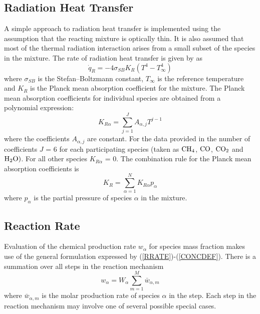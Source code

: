 \documentclass[dvips]{article}
\begin{document}
\subsection{Radiation Heat Transfer}
\label{SEC:RADCAL}
A simple approach to radiation heat transfer is implemented using the
assumption that the reacting mixture is optically thin.  It is also
assumed that most of the thermal radiation interaction arises
from a small subset of the species in the mixture.  The rate of
radiation heat transfer is given by \cite{JuEtAl} as
\begin{equation}
\dot{q}_{R} = -4\sigma_{SB} K_{R}\left(T^{4} - T_{\infty}^{4}\right)
\end{equation}
where $\sigma_{SB}$ is the Stefan--Boltzmann constant, $T_{\infty}$ is
the reference temperature and $K_{R}$ is the Planck mean absorption
coefficient for the mixture.  The Planck mean absorption coefficients
for individual species are obtained from a polynomial expression:
\begin{equation}
K_{R\alpha} = \sum_{j=1}^{J}A_{\alpha,j}T^{j-1}
\end{equation}
where the coefficients $A_{\alpha,j}$ are constant.  For the data
provided in \cite{JuEtAl} the number of coefficients $J$ = 6 for each
participating species (taken as ${\rm CH}_{4}$, ${\rm CO}$, ${\rm CO}_{2}$
and ${\rm H}_{2}{\rm O})$.  For all other species $K_{R\alpha}$ = 0.  The
combination rule for the Planck mean absorption coefficients is
\begin{equation}
K_{R} = \sum_{\alpha=1}^{N}K_{R\alpha}p_{\alpha}
\label{RADCOMBO}
\end{equation}
where $p_{\alpha}$ is the partial pressure of species $\alpha$ in the
mixture.

\subsection{Reaction Rate}
Evaluation of the chemical production rate $w_{\alpha}$ for species mass
fraction makes use of the general formulation expressed by
(\ref{RRATE})-(\ref{CONCDEF}).  There is a summation over all steps in the
reaction mechanism
\begin{equation}
w_{\alpha} = W_{\alpha} \sum_{m=1}^{M} \bar{w}_{\alpha,m}
\label{SUMRATE}
\end{equation}
where $\bar{w}_{\alpha,m}$ is the molar production rate of species $\alpha$
in the step.  Each step in the reaction mechanism may
involve one of several possible special cases.
\end{document}
